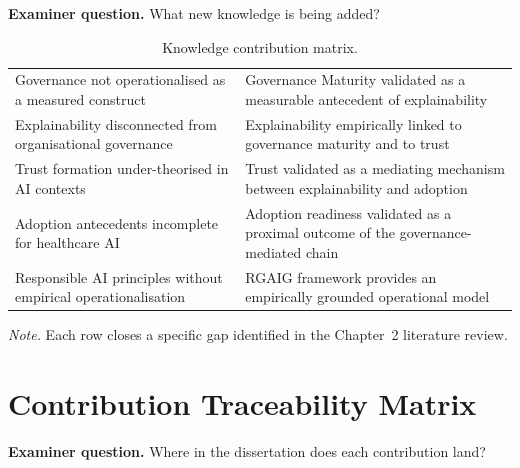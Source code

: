 \noindent\textbf{Examiner question.} What new knowledge is being added?

{\tablestripes\tablefontsize
{}
\begin{xltabular}{\textwidth}{@{} >{\raggedright\arraybackslash}p{4.5cm} L @{}}
\caption[Knowledge contribution matrix]{Knowledge contribution matrix.}\label{tab:dist_knowledge_contribution} \\
\toprule
{} &  \\
\midrule
\endfirsthead
\endhead
\bottomrule
\endlastfoot
Governance not operationalised as a measured construct & Governance Maturity validated as a measurable antecedent of explainability \\
\addlinespace
Explainability disconnected from organisational governance & Explainability empirically linked to governance maturity and to trust \\
\addlinespace
Trust formation under-theorised in AI contexts & Trust validated as a mediating mechanism between explainability and adoption \\
\addlinespace
Adoption antecedents incomplete for healthcare AI & Adoption readiness validated as a proximal outcome of the governance-mediated chain \\
\addlinespace
Responsible AI principles without empirical operationalisation & RGAIG framework provides an empirically grounded operational model \\
\end{xltabular}}

\vspace{0.3em}\noindent\textit{Note.} Each row closes a specific gap identified in the Chapter~2 literature review.


\section{Contribution Traceability Matrix}
\label{app:distinction_contribution_traceability}

\noindent\textbf{Examiner question.} Where in the dissertation does each contribution land?

